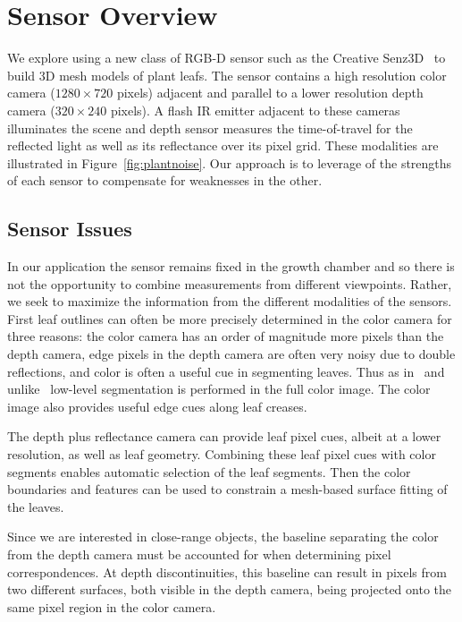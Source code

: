 \section{Sensor Overview}
\label{sec:overview}

We explore using a new class of RGB-D sensor such as the Creative Senz3D~\cite{nguyen2015vietnamese} to build 3D mesh models of plant leafs. The sensor contains a high resolution color camera ($1280 \times 720$ pixels) adjacent and parallel to a lower resolution depth camera ($320\times240$ pixels).  A flash IR emitter adjacent to these cameras illuminates the scene and depth sensor measures the time-of-travel for the reflected light as well as its reflectance over its pixel grid.  These modalities are illustrated in Figure~\ref{fig:plantnoise}.  Our approach is to leverage of the strengths of each sensor to compensate for weaknesses in the other.  

\subsection{Sensor Issues}

In our application the sensor remains fixed in the growth chamber and so there is not the opportunity to combine measurements from different viewpoints.  Rather, we seek to maximize the information from the different modalities of the sensors.  First leaf outlines can often be more precisely determined in the color camera for three reasons: the color camera has an order of magnitude more pixels than the depth camera, edge pixels in the depth camera are often very noisy due to double reflections, and color is often a useful cue in segmenting leaves.  Thus as in~\cite{Dellen2011} and unlike~\cite{Alenya2011,Alenya2013} low-level segmentation is performed in the full color image.  The color image also provides useful edge cues along leaf creases.

The depth plus reflectance camera can provide leaf pixel cues, albeit at a lower resolution, as well as leaf geometry. Combining these leaf pixel cues with color segments enables automatic selection of the leaf segments.  Then the color boundaries and features can be used to constrain a mesh-based surface fitting of the leaves.

Since we are interested in close-range objects, the baseline separating the color from the depth camera must be accounted for when determining pixel correspondences.  At depth discontinuities, this baseline can result in pixels from two different surfaces, both visible in the depth camera, being projected onto the same pixel region in the color camera.  


